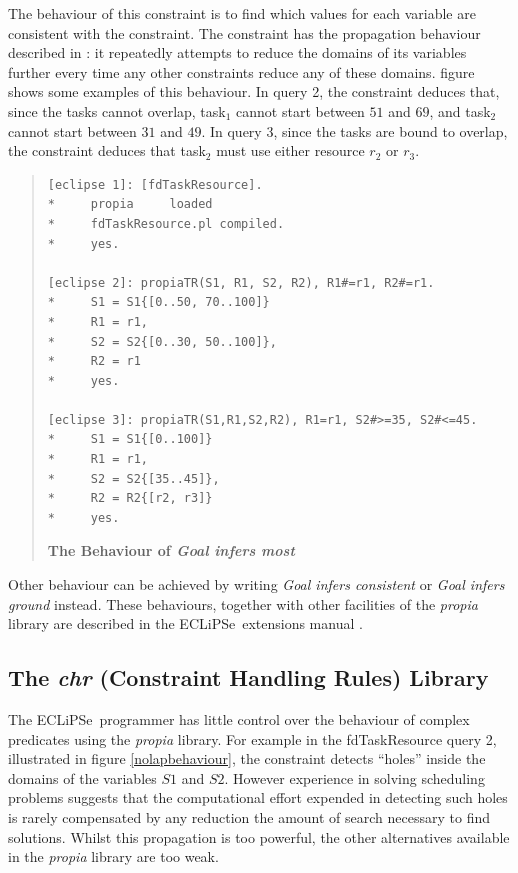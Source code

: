 \documentclass[a4wide]{article}
\newcommand{\ECL}{\mbox{ECLiPSe\ }{\hspace{1mm}}}
\begin{document}
The behaviour of this constraint is to find which values for each
variable are consistent with the constraint.
The constraint has the propagation behaviour described in
\cite{consprog}: 
it repeatedly attempts to reduce the domains of its variables further
every time 
any other constraints reduce any of these domains.
figure \pageref{nolapbehaviour} shows some examples of this behaviour.
In query 2, the constraint deduces that, since the tasks cannot
overlap, task$_1$ cannot start between $51$ and $69$, and task$_2$ cannot
start between $31$ and $49$.
In query 3, since the tasks are bound to overlap, the constraint
deduces that task$_2$ must use either resource $r_2$ or $r_3$.

\begin{quote}
\begin{verbatim}
[eclipse 1]: [fdTaskResource].
*     propia     loaded
*     fdTaskResource.pl compiled.
*     yes.

[eclipse 2]: propiaTR(S1, R1, S2, R2), R1#=r1, R2#=r1.
*     S1 = S1{[0..50, 70..100]}
*     R1 = r1,
*     S2 = S2{[0..30, 50..100]}, 
*     R2 = r1
*     yes.

[eclipse 3]: propiaTR(S1,R1,S2,R2), R1=r1, S2#>=35, S2#<=45.
*     S1 = S1{[0..100]}
*     R1 = r1,
*     S2 = S2{[35..45]}, 
*     R2 = R2{[r2, r3]}
*     yes.

\end{verbatim}
{\bf The Behaviour of {\em Goal infers most}}
\label{nolapbehaviour}
\end{quote} 

Other behaviour can be achieved by writing {\em Goal infers
consistent}
or {\em Goal infers ground} instead.
These behaviours, together with other facilities of the {\em propia}
library are described in the \ECL extensions manual \cite{eclipseext}.

\subsection{The {\em chr} (Constraint Handling Rules) Library}
The \ECL programmer has little control over the behaviour of complex
predicates using the {\em propia} library.
For example in the fdTaskResource query 2, illustrated in figure
\ref{nolapbehaviour}, the constraint detects
``holes'' inside the domains of the variables $S1$ and $S2$.
However experience in solving scheduling problems suggests that the
computational effort expended in 
detecting such holes is rarely compensated by any reduction the amount of
search necessary to find solutions.
Whilst this propagation is too powerful, the other alternatives
available in the  {\em propia} library are too weak.
\end{document}
